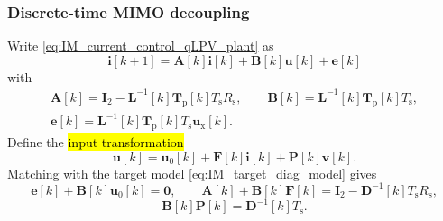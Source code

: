\begin{frame}
    \frametitle{Discrete-time MIMO decoupling}
    Write \eqref{eq:IM_current_control_qLPV_plant} as
    \begin{equation}
        \bm{i}[k+1]=\bm{A}[k]\bm{i}[k]+\bm{B}[k]\bm{u}[k]+\bm{e}[k]
    \end{equation}\pause%
    with
    \begin{equation}
        \begin{gathered}
            \bm{A}[k]=\bm{I}_2-\bm{L}^{-1}[k]\bm{T}_{\mathrm{p}}[k]T_\mathrm{s}R_\mathrm{s},\qquad
            \bm{B}[k]=\bm{L}^{-1}[k]\bm{T}_{\mathrm{p}}[k]T_\mathrm{s},\\
            \bm{e}[k]=\bm{L}^{-1}[k]\bm{T}_{\mathrm{p}}[k]T_\mathrm{s}\bm{u}_\mathrm{x}[k].
        \end{gathered}
    \end{equation}\pause%
    Define the \hl{input transformation}
    \begin{equation}
        \bm{u}[k]=\bm{u}_\mathrm{0}[k]+\bm{F}[k]\bm{i}[k]+\bm{P}[k]\bm{v}[k].
        \label{eq:IM_input_transformation}
    \end{equation}\pause%
    Matching with the target model \eqref{eq:IM_target_diag_model} gives
    \begin{equation}
        \bm{e}[k]+\bm{B}[k]\bm{u}_\mathrm{0}[k]=\bm{0},\qquad
        \bm{A}[k]+\bm{B}[k]\bm{F}[k]=\bm{I}_2-\bm{D}^{-1}[k]T_\mathrm{s}R_\mathrm{s},
    \end{equation}
    \begin{equation}
        \bm{B}[k]\bm{P}[k]=\bm{D}^{-1}[k]T_\mathrm{s}.
    \end{equation}
\end{frame}

